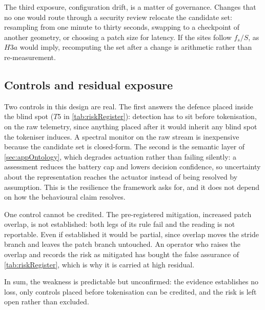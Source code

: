 The third exposure, configuration drift, is a matter of governance. Changes that no one would route through a security review relocate the candidate set: resampling from one minute to thirty seconds, swapping to a checkpoint of another geometry, or choosing a patch size for latency. If the sites follow $f_s/S$, as $H3a$ would imply, recomputing the set after a change is arithmetic rather than re-measurement.

\subsection{Controls and residual exposure}

Two controls in this design are real. The first answers the defence placed inside the blind spot ($T5$ in \autoref{tab:riskRegister}): detection has to sit before tokenisation, on the raw telemetry, since anything placed after it would inherit any blind spot the tokeniser induces. A spectral monitor on the raw stream is inexpensive because the candidate set is closed-form. The second is the semantic layer of \autoref{sec:appOntology}, which degrades actuation rather than failing silently: a  assessment reduces the battery cap and lowers decision confidence, so uncertainty about the representation reaches the actuator instead of being resolved by assumption. This is the resilience the framework asks for, and it does not depend on how the behavioural claim resolves.

One control cannot be credited. The pre-registered mitigation, increased patch overlap, is not established: both legs of its rule fail and the reading is not reportable. Even if established it would be partial, since overlap moves the stride branch and leaves the patch branch untouched. An operator who raises the overlap and records the risk as mitigated has bought the false assurance of \autoref{tab:riskRegister}, which is why it is carried at high residual.

In sum, the weakness is predictable but unconfirmed: the evidence establishes no loss, only controls placed before tokenisation can be credited, and the risk is left open rather than excluded.
